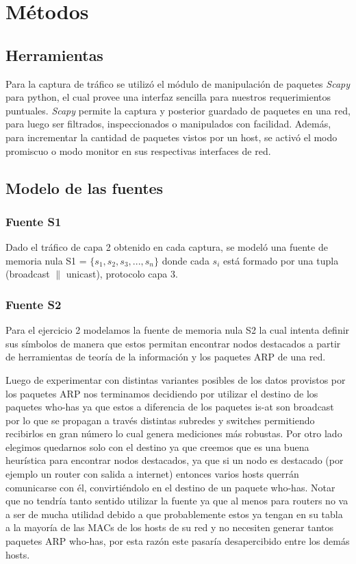 \section{Métodos}
\subsection*{Herramientas}
Para la captura de tráfico se utilizó el módulo de manipulación de paquetes \emph{Scapy} para python, el cual provee una interfaz sencilla para nuestros requerimientos puntuales. \emph{Scapy} permite la captura y posterior guardado de paquetes en una red, para luego ser filtrados, inspeccionados o manipulados con facilidad. Además, para incrementar la cantidad de paquetes vistos por un host, se activó el modo promiscuo o modo monitor en sus respectivas interfaces de red.

\subsection*{Modelo de las fuentes}

\subsubsection*{Fuente S1}
Dado el tráfico de capa 2 obtenido en cada captura, se modeló una fuente de memoria nula S1 = $ \{ s_{1}, s_{2}, s_{3},...,s_{n} \}$ donde cada $ s_{i} $ está formado por una tupla (broadcast $\|$ unicast), protocolo capa 3.

\subsubsection*{Fuente S2}
Para el ejercicio 2 modelamos la fuente de memoria nula S2 la cual intenta definir sus símbolos de manera que estos permitan encontrar nodos destacados a partir de herramientas de teoría de la información y los paquetes ARP de una red.

Luego de experimentar con distintas variantes posibles de los datos provistos por los paquetes ARP nos terminamos decidiendo por utilizar el destino de los paquetes who-has ya que estos a diferencia de los paquetes is-at son broadcast por lo que se propagan a través distintas subredes y switches permitiendo recibirlos en gran número lo cual genera mediciones más robustas. Por otro lado elegimos quedarnos solo con el destino ya que creemos que es una buena heurística para encontrar nodos destacados, ya que si un nodo es destacado (por ejemplo un router con salida a internet) entonces varios hosts querrán comunicarse con él, convirtiéndolo en el destino de un paquete who-has. Notar que no tendría tanto sentido utilizar la fuente ya que al menos para routers no va a ser de mucha utilidad debido a que probablemente estos ya tengan en su tabla a la mayoría de las MACs de los hosts de su red y no necesiten generar tantos paquetes ARP who-has, por esta razón este pasaría desapercibido entre los demás hosts.

